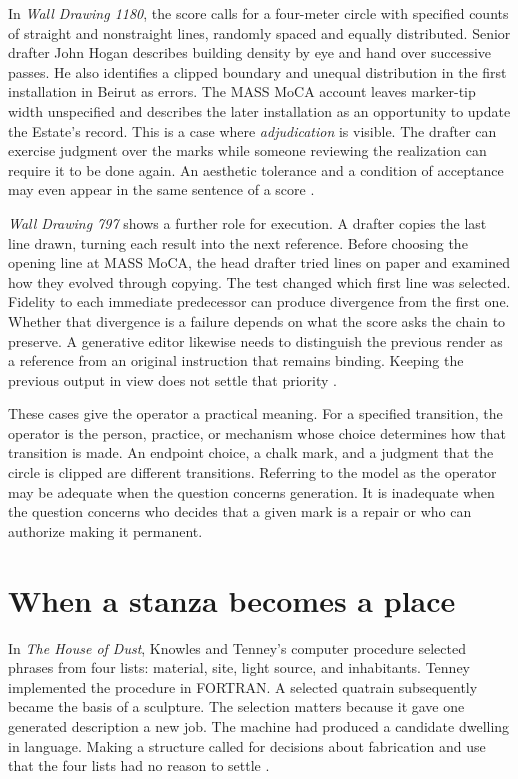 \documentclass[11pt,letterpaper]{article}
\newcommand{\work}[1]{\textit{#1}}
\begin{document}
In \work{Wall Drawing 1180}, the score calls for a four-meter circle with specified counts of straight and nonstraight lines, randomly spaced and equally distributed. Senior drafter John Hogan describes building density by eye and hand over successive passes. He also identifies a clipped boundary and unequal distribution in the first installation in Beirut as errors. The MASS MoCA account leaves marker-tip width unspecified and describes the later installation as an opportunity to update the Estate’s record. This is a case where \emph{adjudication} is visible. The drafter can exercise judgment over the marks while someone reviewing the realization can require it to be done again. An aesthetic tolerance and a condition of acceptance may even appear in the same sentence of a score \citep{LeWitt1180}.

\work{Wall Drawing 797} shows a further role for execution. A drafter copies the last line drawn, turning each result into the next reference. Before choosing the opening line at MASS MoCA, the head drafter tried lines on paper and examined how they evolved through copying. The test changed which first line was selected. Fidelity to each immediate predecessor can produce divergence from the first one. Whether that divergence is a failure depends on what the score asks the chain to preserve. A generative editor likewise needs to distinguish the previous render as a reference from an original instruction that remains binding. Keeping the previous output in view does not settle that priority \citep{LeWitt797,BolterHartsoe}.

These cases give the operator a practical meaning. For a specified transition, the operator is the person, practice, or mechanism whose choice determines how that transition is made. An endpoint choice, a chalk mark, and a judgment that the circle is clipped are different transitions. Referring to the model as the operator may be adequate when the question concerns generation. It is inadequate when the question concerns who decides that a given mark is a repair or who can authorize making it permanent.

\section{When a stanza becomes a place}

In \work{The House of Dust}, Knowles and Tenney’s computer procedure selected phrases from four lists: material, site, light source, and inhabitants. Tenney implemented the procedure in FORTRAN. A selected quatrain subsequently became the basis of a sculpture. The selection matters because it gave one generated description a new job. The machine had produced a candidate dwelling in language. Making a structure called for decisions about fabrication and use that the four lists had no reason to settle \citep{MoMAKnowles,Taylor2009,KnowlesSarbanes}.
\end{document}
